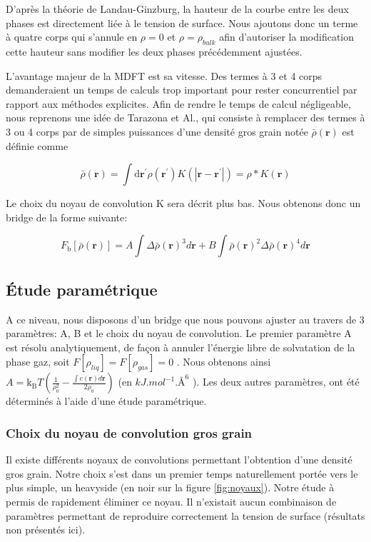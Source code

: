 D'après la théorie de Landau-Ginzburg\cite{Ginzburg2009}, la hauteur de la courbe entre les deux phases est directement liée à le tension de surface. Nous ajoutons donc un terme à quatre corps qui s'annule en $\rho=0$ et $\rho=\rho_{bulk}$ afin d'autoriser la modification cette hauteur sans modifier les deux phases précédemment ajustées.

L'avantage majeur de la MDFT est sa vitesse. Des termes à 3 et 4 corps demanderaient un temps de calculs trop important pour rester concurrentiel par rapport aux méthodes explicites. Afin de rendre le temps de calcul négligeable, nous reprenons une idée de Tarazona et Al.\cite{tarazona_free-energy_1985}, qui consiste à remplacer des termes à 3 ou 4 corps par de simples puissances d'une densité gros grain notée $\bar{\rho}(\boldsymbol{r})$ est définie comme

\begin{equation} \label{eq:convolution_gros_grain}
\bar{\rho}(\boldsymbol{r}) = \int \mathrm{d}\boldsymbol{r}^\prime \rho(\boldsymbol{r}^\prime) K\left(\left|\boldsymbol{r}-\boldsymbol{r}^\prime\right|\right) = \rho\ast K \left( \boldsymbol{r} \right)
\end{equation}

Le choix du noyau de convolution K sera décrit plus bas. Nous obtenons donc un bridge de la forme suivante:

\begin{equation} \label{eq:fbridge_2}
F_{\mathrm{b}}[\bar{\rho}(\boldsymbol{r})]=A\int\Delta\bar{\rho}(\boldsymbol{r})^3d\boldsymbol{r}+B\int\bar{\rho}(\boldsymbol{r})^2\Delta\bar{\rho}(\boldsymbol{r})^4d\boldsymbol{r}
\end{equation} 


\subsection{\'Etude paramétrique}
A ce niveau, nous disposons d'un bridge que nous pouvons ajuster au travers de 3 paramètres: A, B et le choix du noyau de convolution. Le premier paramètre A est résolu analytiquement, de façon à annuler l'énergie libre de solvatation de la phase gaz, soit $F[\rho_{liq}]=F[\rho_{gas}]=0$ . Nous obtenons ainsi $A=\mathrm{k_B}T(\frac{1}{\rho_0^2} - \frac{\int c(\boldsymbol{r}) d\boldsymbol{r}}{2\rho_0})$ (en $kJ.mol^{-1}.\text{\AA}^{6}$ ). Les deux autres paramètres, ont été déterminés à l'aide d'une étude paramétrique.

\subsubsection{Choix du noyau de convolution gros grain}
Il existe différents noyaux de convolutions permettant l'obtention d'une densité gros grain. Notre choix s'est dans un premier temps naturellement portée vers le plus simple, un heavyside (en noir sur la figure \ref{fig:noyaux}). Notre étude à permis de rapidement éliminer ce noyau. Il n'existait aucun combinaison de paramètres permettant de reproduire correctement la tension de surface (résultats non présentés ici). 










